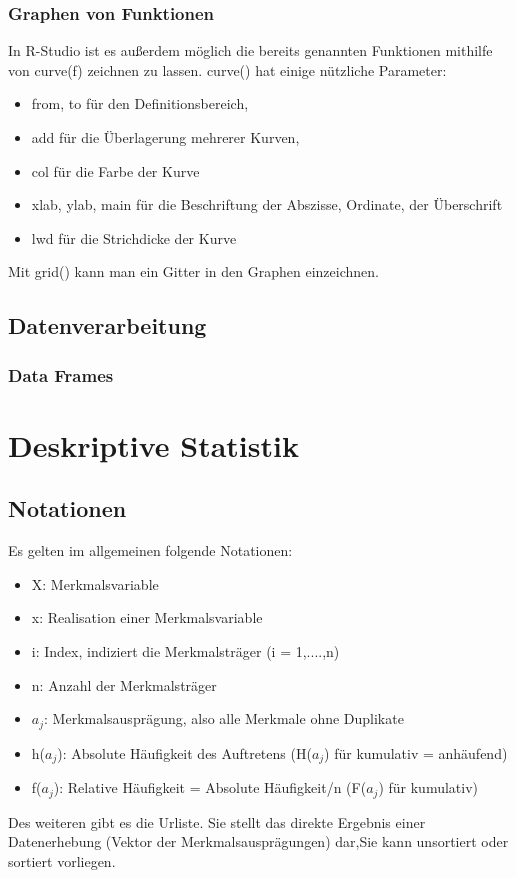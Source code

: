 \documentclass[a4paper,10pt]{scrartcl}
\begin{document}
\subsubsection{Graphen von Funktionen}
In R-Studio ist es außerdem möglich die bereits genannten Funktionen mithilfe von curve(f) zeichnen zu lassen. curve() hat einige nützliche Parameter:
\begin{itemize}
    \item from, to für den Definitionsbereich,
    \item add für die Überlagerung mehrerer Kurven,
    \item col für die Farbe der Kurve
    \item xlab, ylab, main für die Beschriftung der Abszisse, Ordinate, der Überschrift
    \item lwd für die Strichdicke der Kurve
\end{itemize}
Mit grid() kann man ein Gitter in den Graphen einzeichnen.

\subsection{Datenverarbeitung}
\subsubsection{Data Frames}

\newpage\section{Deskriptive Statistik}
\subsection{Notationen}
Es gelten im allgemeinen folgende Notationen:
\begin{itemize}
    \item X: Merkmalsvariable
    \item x: Realisation einer Merkmalsvariable
    \item i: Index, indiziert die Merkmalsträger (i = 1,....,n)
    \item n: Anzahl der Merkmalsträger
    \item \(a_j\): Merkmalsausprägung, also alle Merkmale ohne Duplikate
    \item h(\(a_j\)): Absolute Häufigkeit des Auftretens (H(\(a_j\)) für kumulativ = anhäufend)
    \item f(\(a_j\)): Relative Häufigkeit = Absolute Häufigkeit/n (F(\(a_j\)) für kumulativ)
\end{itemize}
Des weiteren gibt es die Urliste. Sie stellt das direkte Ergebnis einer Datenerhebung (Vektor der Merkmalsausprägungen) dar,Sie kann unsortiert oder sortiert vorliegen.
\end{document}
